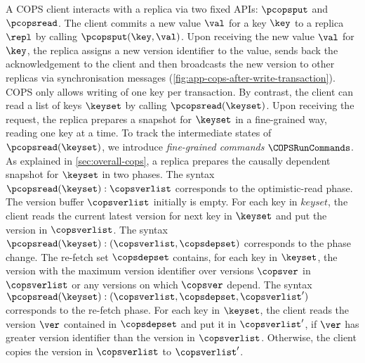 A COPS client interacts with a replica via two fixed APIs: \( \pcopsput \) and \( \pcopsread \).
The client commits a new value \( \val \) for a key \( \key \) to a replica \( \repl \) by calling  \( \pcopsput(\key,\val) \).
Upon receiving the new value  \( \val \) for \( \key \),
the replica assigns a new version identifier to the value, sends back the acknowledgement to the client
and then broadcasts the new version to other replicas via synchronisation messages (\cref{fig:app-cops-after-write-transaction}).
COPS only allows writing of one key per transaction.
By contrast, the client can read a list of keys \( \keyset \) by calling \( \pcopsread(\keyset) \).
Upon receiving the request,
the replica prepares a snapshot for \( \keyset \) in a fine-grained way, reading one key at a time.
To track the intermediate states of \(\pcopsread(\keyset)\), 
we introduce \emph{fine-grained commands} \( \COPSRunCommands \).
As explained in \cref{sec:overall-cops},
a replica prepares the causally dependent snapshot for \( \keyset \) in two phases.
The syntax \( \pcopsread(\keyset) : \copsverlist \) corresponds to the optimistic-read phase.
The version buffer \(  \copsverlist \) initially is empty.
For each key in \( keyset \), 
the client reads the current latest version for next key in \( \keyset \) 
and put the version in \( \copsverlist \).
The syntax \( \pcopsread(\keyset) : (\copsverlist,\copsdepset) \) corresponds to the phase change.
The re-fetch set \( \copsdepset \) contains, for each key in \( \keyset \), 
the version with the maximum version identifier over versions \( \copsver \) in \( \copsverlist \) 
or any versions on which \( \copsver \) depend.
The syntax \( \pcopsread(\keyset) : (\copsverlist,\copsdepset,\copsverlist') \) corresponds to the re-fetch phase.
For each key in \( \keyset \), 
the client reads the version \( \ver \) contained in \( \copsdepset \) and put it in \( \copsverlist' \),
if \( \ver \) has greater version identifier than the version in \( \copsverlist \).
Otherwise, the client copies the version in \( \copsverlist \) to \( \copsverlist' \).


